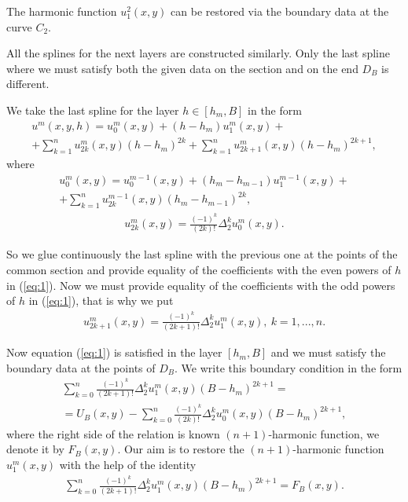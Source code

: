 \documentclass{amsart}
\begin{document}
The harmonic function $u^2_1(x,y)$ can be restored via the boundary
data at the curve $C_2$.

All the splines for the next layers are constructed similarly. Only
the last spline where we must satisfy both the given data on the
section and on the end $D_B$ is different.

We take the last spline for the layer $h \in [h_m,B]$ in the form
\begin{eqnarray}
u^m(x,y,h)=u^m_0(x,y)+(h-h_m) u^m_1(x,y)+ \nonumber \\
+ \sum_{k=1}^n u_{2 k}^m(x,y) (h-h_m)^{2 k} + \sum_{k=1}^n u_{2
k+1}^m(x,y) (h-h_m)^{2 k+1},\nonumber
\end{eqnarray}
where
\begin{eqnarray}
u^m_0(x,y)=u^{m-1}_0(x,y)+(h_m-h_{m-1}) u^{m-1}_1(x,y) +\nonumber\\
+ \sum_{k=1}^n u_{2 k}^{m-1}(x,y) (h_m-h_{m-1})^{2 k},\nonumber
\end{eqnarray}
\begin{eqnarray}
u_{2 k}^m(x,y)=\frac{(-1)^k}{(2 k)!}
\Delta_2^{k}u^m_0(x,y).\nonumber
\end{eqnarray}

So we glue continuously the last spline with the previous one at the
points of the common section and provide equality of the
coefficients with the even powers of $h$ in (\ref{eq:1}). Now we
must provide equality of the coefficients with the odd powers of $h$
in (\ref{eq:1}), that is why we put
\begin{eqnarray}
u_{2k+1}^m(x,y)=\frac{(-1)^{k}}{(2k+1)!} \Delta_2^{k} u^m_1(x,y),\
k=1,...,n.\nonumber
\end{eqnarray}

Now equation (\ref{eq:1}) is satisfied in the layer $[h_m,B]$ and we
must satisfy the boundary data at the points of  $D_B$. We write
this boundary condition in the form
\begin{eqnarray}
\sum\limits_{k=0}^{n}\frac{(-1)^{k}}{(2k+1)!} \Delta_2^{k}
u^m_1(x,y) (B-h_m)^{2 k+1} =\nonumber\\
=U_B(x,y)-\sum\limits_{k=0}^{n}\frac{(-1)^{k}}{(2k)!} \Delta_2^{k}
u^m_0(x,y) (B-h_m)^{2 k+1},\nonumber
\end{eqnarray}
where the right side of the relation is known $(n+1)$-harmonic
function, we denote it by $F_B(x,y)$. Our aim is to restore the
$(n+1)$-harmonic function $u^m_1(x,y)$ with the help of the identity
\begin{eqnarray}
\sum\limits_{k=0}^{n}\frac{(-1)^{k}}{(2k+1)!} \Delta_2^{k}
u^m_1(x,y) (B-h_m)^{2 k+1} =F_B(x,y).\label{eq:2}
\end{eqnarray}
\end{document}
